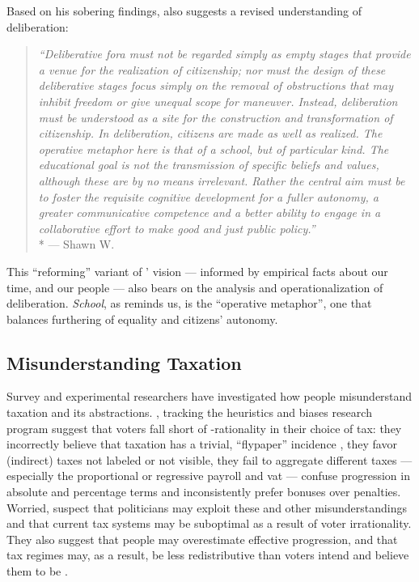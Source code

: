 Based on his sobering findings, \citet[20]{Rosenberg-2007-aa} also suggests a revised understanding of deliberation:

\begin{quotation}
	\emph{``Deliberative fora must not be regarded simply as empty stages that provide a venue for the realization of citizenship;
	nor must the design of these deliberative stages focus simply on the removal of obstructions that may inhibit freedom or give unequal scope for maneuver.
	Instead, deliberation must be understood as a site for the construction and transformation of citizenship.
	In deliberation, citizens are made as well as realized.
	The operative metaphor here is that of a school, but of particular kind.
	The educational goal is not the transmission of specific beliefs and values, although these are by no means irrelevant.
	Rather the central aim must be to foster the requisite cognitive development for a fuller autonomy, a greater communicative competence and a better ability to engage in a collaborative effort to make good and just public policy.''}
	\\*
	--- Shawn W.\ \citet[20]{Rosenberg-2007-aa}
\end{quotation}

This ``reforming'' variant of \citeauthor{Habermas-1984}' vision --- informed by empirical facts about our time, and our people --- also bears on the analysis and operationalization of deliberation.
\emph{School}, as \citeauthor{Rosenberg-2007-aa} reminds us, is the ``operative metaphor'', one that balances furthering of equality and citizens' autonomy.


\subsection{Misunderstanding Taxation}
Survey and experimental researchers have investigated how people misunderstand taxation and its abstractions.
\cite{McCafferyBaron2003}, tracking the heuristics and biases research program \citep{KahnemanEtAl1982} suggest that voters fall short of \citeauthor{VonNeumannMorgenstern1944}-rationality in their choice of tax:
they incorrectly believe that taxation has a trivial, ``flypaper'' incidence \citep{McCafferyBaron2004b}, they favor (indirect) taxes not labeled or not visible, they fail to aggregate different taxes --- especially the proportional or regressive \gls{payroll} and \gls{vat} --- confuse progression in absolute and percentage terms and inconsistently prefer bonuses over penalties.
Worried, \cite{McCafferyBaron2004} suspect that politicians may exploit these and other misunderstandings and that current tax systems may be suboptimal as a result of voter irrationality.
They also suggest that people may overestimate effective progression, and that tax regimes may, as a result, be less redistributive than voters intend and believe them to be \citep{McCafferyBaron2004}.

